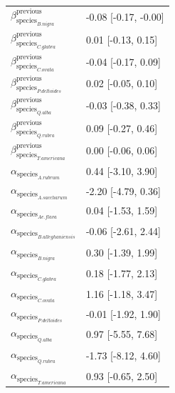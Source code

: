 \documentclass{article}\usepackage[]{graphicx}\usepackage[]{xcolor}
\begin{document}
\begin{table}[ht]
\begin{tabular}{ll}
  $\beta_{\text{species}_{B. nigra}}^{\text{previous}}$ & -0.08 [-0.17, -0.00] \\ 
  $\beta_{\text{species}_{C. glabra}}^{\text{previous}}$ & 0.01 [-0.13, 0.15] \\ 
  $\beta_{\text{species}_{C. ovata}}^{\text{previous}}$ & -0.04 [-0.17, 0.09] \\ 
  $\beta_{\text{species}_{P. deltoides}}^{\text{previous}}$ & 0.02 [-0.05, 0.10] \\ 
  $\beta_{\text{species}_{Q. alba}}^{\text{previous}}$ & -0.03 [-0.38, 0.33] \\ 
  $\beta_{\text{species}_{Q. rubra}}^{\text{previous}}$ & 0.09 [-0.27, 0.46] \\ 
  $\beta_{\text{species}_{T. americana}}^{\text{previous}}$ & 0.00 [-0.06, 0.06] \\ 
  $\alpha_{\text{species}_{A. rubrum}}$ & 0.44 [-3.10, 3.90] \\ 
  $\alpha_{\text{species}_{A. saccharum}}$ & -2.20 [-4.79, 0.36] \\ 
  $\alpha_{\text{species}_{Ae. flava}}$ & 0.04 [-1.53, 1.59] \\ 
  $\alpha_{\text{species}_{B. alleghaniensis}}$ & -0.06 [-2.61, 2.44] \\ 
  $\alpha_{\text{species}_{B. nigra}}$ & 0.30 [-1.39, 1.99] \\ 
  $\alpha_{\text{species}_{C. glabra}}$ & 0.18 [-1.77, 2.13] \\ 
  $\alpha_{\text{species}_{C. ovata}}$ & 1.16 [-1.18, 3.47] \\ 
  $\alpha_{\text{species}_{P. deltoides}}$ & -0.01 [-1.92, 1.90] \\ 
  $\alpha_{\text{species}_{Q. alba}}$ & 0.97 [-5.55, 7.68] \\ 
  $\alpha_{\text{species}_{Q. rubra}}$ & -1.73 [-8.12, 4.60] \\ 
  $\alpha_{\text{species}_{T. americana}}$ & 0.93 [-0.65, 2.50] \\ 
   \hline
\end{tabular}
\end{table}
\end{document}
